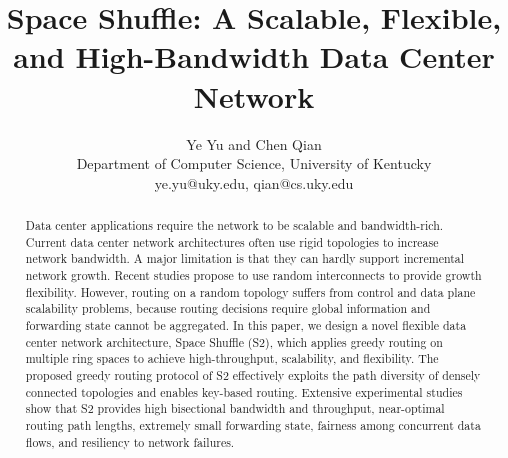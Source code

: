 \documentclass[10pt,conference]{IEEEtran}
\begin{document}
\title{Space Shuffle: A Scalable, Flexible, and High-Bandwidth Data Center Network}
\author{
Ye Yu and  Chen Qian\\
Department of Computer Science,
University of Kentucky \\
ye.yu@uky.edu, qian@cs.uky.edu\\
}
\maketitle

\begin{abstract}
Data center applications require the network to be scalable and  bandwidth-rich.
Current data center network architectures often use rigid topologies to increase network bandwidth. A major limitation is that they can hardly support incremental network growth. Recent studies propose to use random interconnects to provide growth flexibility. However,  routing on a random topology suffers from control and data plane scalability problems, because routing decisions require global information and forwarding state cannot be aggregated. In this paper, we design a novel flexible data center network architecture, Space Shuffle (S2), which applies greedy routing on multiple ring spaces to achieve high-throughput, scalability, and flexibility. The proposed greedy routing protocol of S2 effectively exploits the path diversity of densely connected topologies and enables key-based routing.  Extensive experimental studies show that S2
provides high bisectional bandwidth and throughput, near-optimal routing path lengths, extremely small forwarding state,  fairness among concurrent data flows, and resiliency to network failures.

\iffalse
Greedy routing has been applied to data center networks because it requires extremely small forwarding state and enables efficient key-based routing which benefit many application relying on key-value stores.
However the network topology that ensures greedy routing to make progress is relatively rigid and does not support incremental growth of network size.
Moreover, greedy routing cannot easily incorporate with multi-path routing which is an essential service because data center networks are usually densely connected and provide multiple parallel paths between any pair of servers to improve bandwidth.
In this paper we propose a high-bandwidth and flexible data center network architecture, Space Shuffle (S2).
We design a new greedy routing protocol that makes routing decision based on switches coordinates in multiple virtual spaces, called greediest routing.
Multi-path routing and key-based routing can be implemented in S2 by slightly changing the greediest routing protocol.
Extensive experimental studies show that S2 provides high bisection bandwidth and network throughput, near-optimal routing path lengths, extremely small forwarding state,  fairness among concurrent data flows, and resiliency to network failures.
 \fi
\end{abstract}
\end{document}

